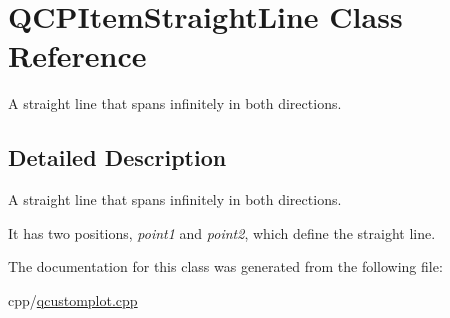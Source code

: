 \hypertarget{class_q_c_p_item_straight_line}{}\section{Q\+C\+P\+Item\+Straight\+Line Class Reference}
\label{class_q_c_p_item_straight_line}


A straight line that spans infinitely in both directions.  




\subsection{Detailed Description}
A straight line that spans infinitely in both directions. 

 It has two positions, {\itshape point1} and {\itshape point2}, which define the straight line. 

The documentation for this class was generated from the following file\+:\begin{DoxyCompactItemize}
\item 
cpp/\mbox{\hyperlink{qcustomplot_8cpp}{qcustomplot.\+cpp}}\end{DoxyCompactItemize}
